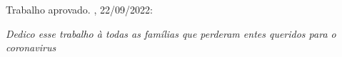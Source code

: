 \documentclass[
    article,
	12pt,				%
	oneside,			%
	a4paper,			%
	english,			%
	brazil,				%
	hyperref = {colorlinks, citecolor=c1d, linkcolor=c2d, urlcolor=c3d, colorlinks}
	]{abntex2}
\begin{document}
\begin{folhadeaprovacao}
  \begin{center}
    {\ABNTEXchapterfont\large\imprimirautor}

    \vspace*{\fill}\vspace*{\fill}
    \begin{center}
      \ABNTEXchapterfont\bfseries\Large\imprimirtitulo
    \end{center}
    \vspace*{\fill}
    
    \hspace{.45\textwidth}
    \begin{minipage}{.5\textwidth}
        \imprimirpreambulo
    \end{minipage}%
    \vspace*{\fill}
   \end{center}
        
   Trabalho aprovado. \imprimirlocal, 22/09/2022:

      
   \begin{center}
    \vspace*{0.5cm}
    {\large\imprimirlocal}
    \par
    {\large\imprimirdata}
    \vspace*{1cm}
  \end{center}
  
\end{folhadeaprovacao}

% 

\newpage
\begin{dedicatoria}
   \vspace*{\fill}
   \centering
   \noindent
   \textit{Dedico esse trabalho à todas as famílias que perderam entes queridos para o coronavirus}\vspace*{\fill}
\end{dedicatoria}
\end{document}
